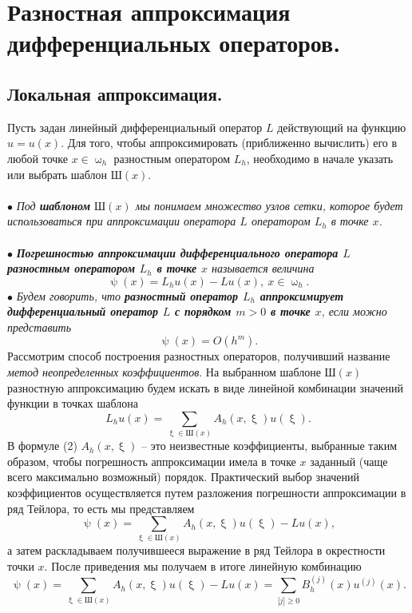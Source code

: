 \documentclass[a4paper, 12pt]{report}
\numberwithin{equation}{section}
\renewcommand{\geq}{\geqslant}
\renewcommand{\psi}{\uppsi}
\renewcommand{\omega}{\upomega}
\renewcommand{\xi}{\upxi}
\begin{document}
\section{Разностная аппроксимация дифференциальных операторов.}
\subsection{Локальная аппроксимация.}
Пусть задан линейный дифференциальный оператор $L$ действующий на функцию $u=u(x)$. Для того, чтобы аппроксимировать (приближенно вычислить) его в любой точке $x\in \omega _h$ разностным оператором $L_h$, необходимо в начале указать или выбрать шаблон $\text {Ш} (x)$. \\\\
$\bullet$ \textit{Под \textbf{шаблоном} $\text{Ш}(x)$ мы понимаем множество узлов сетки, которое будет использоваться при аппроксимации оператора $L$ оператором $L_h$ в точке $x$.}\\\\
$\bullet$ \textit{\textbf{Погрешностью аппроксимации дифференциального оператора $L$ разностным оператором $L_h$ в точке $x$} называется величина }
\begin{equation}
\psi(x) = L_hu(x) - Lu(x),\ x\in \omega_h.
\end{equation}
$\bullet$ \textit{Будем говорить, что \textbf{разностный оператор $L_h$ аппроксимирует дифференциальный оператор $L$ с порядком $m>0$ в точке $x$}, если можно представить} $$\psi(x) = O(h^m).$$
Рассмотрим способ построения разностных операторов, получивший название \textit{метод неопределенных коэффициентов}. На выбранном шаблоне $\text{Ш}(x)$ разностную аппроксимацию будем искать в виде линейной комбинации значений функции в точках шаблона \begin{equation}
L_hu(x) = \sum_{\xi \in \text{Ш}(x)} A_h(x, \xi) u(\xi).
\end{equation}
В формуле (2) $A_h(x, \xi)$ -- это неизвестные коэффициенты, выбранные таким образом, чтобы погрешность аппроксимации имела в точке $x$ заданный (чаще всего максимально возможный) порядок. Практический выбор значений коэффициентов осуществляется путем разложения погрешности аппроксимации в ряд Тейлора, то есть мы представляем $$\psi(x) = \sum_{\xi \in \text{Ш}(x)} A_h(x, \xi) u(\xi) - Lu(x),$$
а затем раскладываем получившееся выражение в ряд Тейлора в окрестности точки $x$. После приведения мы получаем в итоге линейную комбинацию 
$$\psi(x) = \sum_{\xi \in \text{Ш}(x)} A_h(x, \xi) u(\xi) - Lu(x) = \sum_{|j|\geq 0} B_h^{(j)}(x) u^{(j)}(x).$$
\end{document}
